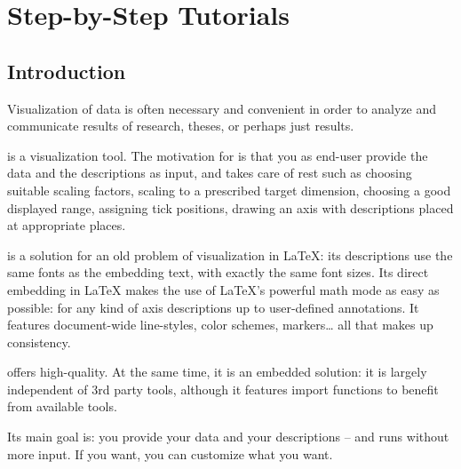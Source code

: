 
\chapter{Step-by-Step Tutorials}
{%
%


\section{Introduction}

Visualization of data is often necessary and convenient in order to analyze and
communicate results of research, theses, or perhaps just results.

\PGFPlots{} is a visualization tool. The motivation for \PGFPlots{} is that you
as end-user provide the data and the descriptions as input, and \PGFPlots{}
takes care of rest such as choosing suitable scaling factors, scaling to a
prescribed target dimension, choosing a good displayed range, assigning tick
positions, drawing an axis with descriptions placed at appropriate places.

\PGFPlots{} is a solution for an old problem of visualization in \LaTeX{}: its
descriptions use the same fonts as the embedding text, with exactly the same
font sizes. Its direct embedding in \LaTeX{} makes the use of \LaTeX{}'s
powerful math mode as easy as possible: for any kind of axis descriptions up to
user-defined annotations. It features document-wide line-styles, color schemes,
markers\ldots{} all that makes up consistency.

\PGFPlots{} offers high-quality. At the same time, it is an embedded solution:
it is largely independent of 3rd party tools, although it features import
functions to benefit from available tools.

Its main goal is: you provide your data and your descriptions -- and
\PGFPlots{} runs without more input. If you want, you can customize what you
want.






}%
